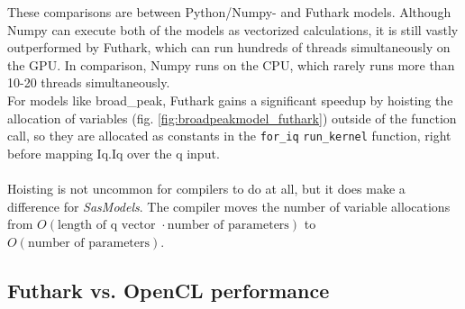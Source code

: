 \documentclass[11pt]{article}
\newcommand{\sasmodels}{\textit{SasModels}}
\newcommand{\foriq}{\texttt{for\_iq}}
\begin{document}
\begin{mdframed}[
  frametitle={Why does Futhark perform faster than Python?},
  nobreak=true
  ]
These comparisons are between Python/Numpy- and Futhark models.
Although Numpy can execute both of the models as vectorized calculations, 
it is still vastly outperformed by Futhark, which can run hundreds of threads 
simultaneously on the GPU. In comparison, Numpy runs on the CPU, which rarely 
runs more than 10-20 threads simultaneously.
\\
For models like broad\_peak, Futhark gains a significant speedup by 
hoisting\cite[sec 2.3]{fhpc17} the allocation of variables 
(fig. \ref{fig:broadpeakmodel_futhark}) outside of
the function call, so they are allocated as constants in the \foriq{} 
\texttt{run\_kernel} function, right before mapping Iq.Iq over the q input.
\\\\
Hoisting is not uncommon for compilers to do at all, but it does make a 
difference for \sasmodels{}.
The compiler moves the number of variable allocations from
$O(\text{length of q vector } \cdot \text{number of parameters})$ to 
$O(\text{number of parameters})$.
\end{mdframed}

\subsection{Futhark vs. OpenCL performance}
\end{document}

